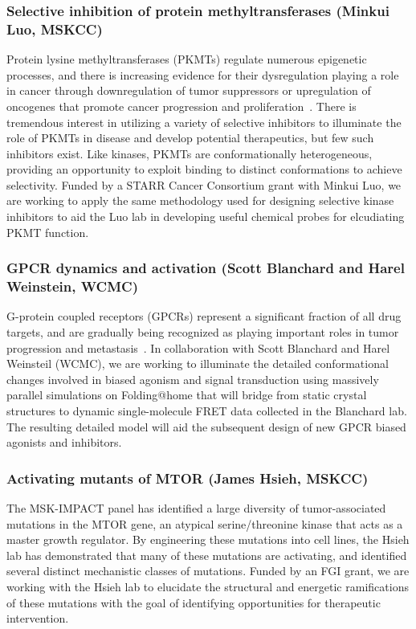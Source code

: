 \documentclass[10pt]{article}
\begin{document}
\subsubsection*{Selective inhibition of protein methyltransferases (Minkui Luo, MSKCC)}
\vspace{-0.3cm}
Protein lysine methyltransferases (PKMTs) regulate numerous epigenetic processes, and there is increasing evidence for their dysregulation playing a role in cancer through downregulation of tumor suppressors or upregulation of oncogenes that promote cancer progression and proliferation~\cite{Copeland:2009:Nat.Rev.DrugDiscov.}.
There is tremendous interest in utilizing a variety of selective inhibitors to illuminate the role of PKMTs in disease and develop potential therapeutics, but few such inhibitors exist.
Like kinases, PKMTs are conformationally heterogeneous, providing an opportunity to exploit binding to distinct conformations to achieve selectivity.
Funded by a STARR Cancer Consortium grant with Minkui Luo, we are working to apply the same methodology used for designing selective kinase inhibitors to aid the Luo lab in developing useful chemical probes for elcudiating PKMT function.

\vspace{-0.5cm}
\subsubsection*{GPCR dynamics and activation (Scott Blanchard and Harel Weinstein, WCMC)}
\vspace{-0.3cm}
G-protein coupled receptors (GPCRs) represent a significant fraction of all drug targets, and are gradually being recognized as playing important roles in tumor progression and metastasis~\cite{Dorsam:2007:Nat.Rev.Cancera}.
In collaboration with Scott Blanchard and Harel Weinsteil (WCMC), we are working to illuminate the detailed conformational changes involved in biased agonism and signal transduction using massively parallel simulations on Folding@home that will bridge from static crystal structures to dynamic single-molecule FRET data collected in the Blanchard lab.
The resulting detailed model will aid the subsequent design of new GPCR biased agonists and inhibitors.

\vspace{-0.5cm}
\subsubsection*{Activating mutants of MTOR (James Hsieh, MSKCC)}
\vspace{-0.3cm}
The MSK-IMPACT panel has identified a large diversity of tumor-associated mutations in the MTOR gene, an atypical serine/threonine kinase that acts as a master growth regulator.
By engineering these mutations into cell lines, the Hsieh lab has demonstrated that many of these mutations are activating, and identified several distinct mechanistic classes of mutations.
Funded by an FGI grant, we are working with the Hsieh lab to elucidate the structural and energetic ramifications of these mutations with the goal of identifying opportunities for therapeutic intervention.
\end{document}
